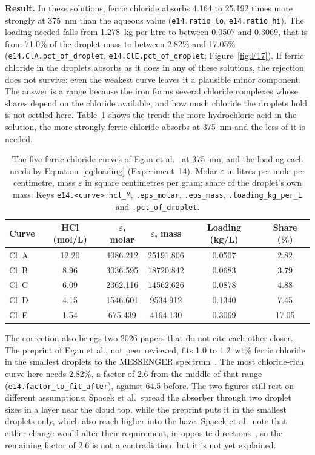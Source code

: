 \textbf{Result.} In these solutions, ferric chloride absorbs 4.164 to 25.192 times more
strongly at 375~nm than the aqueous value (\texttt{e14.ratio\_lo},
\texttt{e14.ratio\_hi}). The loading needed falls from 1.278~kg per litre to between
0.0507 and 0.3069, that is from 71.0\% of the droplet mass to between 2.82\% and 17.05\%
(\texttt{e14.ClA.pct\_of\_droplet}, \texttt{e14.ClE.pct\_of\_droplet};
Figure~\ref{fig:F17}). If ferric chloride in the droplets absorbs as it does in any of
these solutions, the rejection does not survive: even the weakest curve leaves it a
plausible minor component. The answer is a range because the iron forms several chloride
complexes whose shares depend on the chloride available, and how much chloride the
droplets hold is not settled here. Table~\ref{tab:e14} shows the trend: the more hydrochloric acid in
the solution, the more strongly ferric chloride absorbs at 375~nm and the less of it is
needed.

\begin{table}[htbp]
  \centering
  \caption[The five ferric chloride curves at 375~nm (Experiment~14)]{The five ferric chloride curves of Egan et al.~\cite{egan2025lab} at 375~nm,
    and the loading each needs by Equation~\eqref{eq:loading} (Experiment~14). Molar
    $\varepsilon$ in litres per mole per centimetre, mass $\varepsilon$ in square
    centimetres per gram; share of the droplet's own mass. Keys
    \texttt{e14.<curve>.hcl\_M}, \texttt{.eps\_molar}, \texttt{.eps\_mass},
    \texttt{.loading\_kg\_per\_L} and \texttt{.pct\_of\_droplet}.}
  \label{tab:e14}
  \footnotesize
  \begin{tabular}{lccccc}
    \toprule
    Curve & HCl (mol/L) & $\varepsilon$, molar & $\varepsilon$, mass & Loading (kg/L) &
      Share (\%) \\
    \midrule
    Cl~A & 12.20 & 4086.212 & 25191.806 & 0.0507 & 2.82 \\
    Cl~B & 8.96 & 3036.595 & 18720.842 & 0.0683 & 3.79 \\
    Cl~C & 6.09 & 2362.116 & 14562.626 & 0.0878 & 4.88 \\
    Cl~D & 4.15 & 1546.601 & 9534.912 & 0.1340 & 7.45 \\
    Cl~E & 1.54 & 675.439 & 4164.130 & 0.3069 & 17.05 \\
    \bottomrule
  \end{tabular}
\end{table}

The correction also brings two 2026 papers that do not cite each other closer. The
preprint of Egan et al., not peer reviewed, fits 1.0 to 1.2~wt\% ferric chloride in the
smallest droplets to the MESSENGER spectrum~\cite{egan2026}. The most chloride-rich curve
here needs 2.82\%, a factor of 2.6 from the middle of that range
(\texttt{e14.factor\_to\_fit\_after}), against 64.5 before. The two figures still rest on
different assumptions: Spacek et al.\ spread the absorber through two droplet sizes in a
layer near the cloud top, while the preprint puts it in the smallest droplets only, which
also reach higher into the haze. Spacek et al.\ note that either change would alter their
requirement, in opposite directions~\cite{spacek2026}, so the remaining factor of 2.6 is
not a contradiction, but it is not yet explained.

